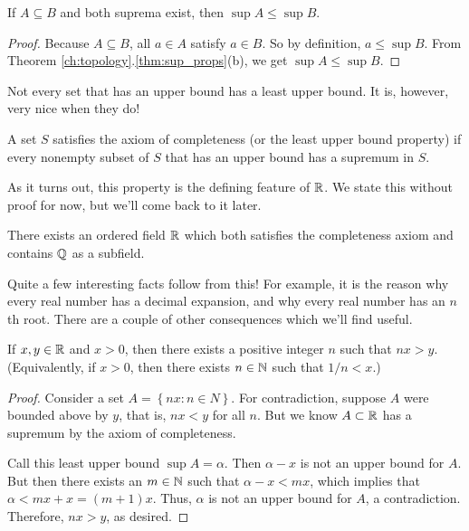 \documentclass[../m131main.tex]{subfiles}
\begin{document}
\begin{theorem}[]
    If $A \subseteq B$ and both suprema exist, then $\sup A \leq \sup B$.
\end{theorem}

\begin{proof}
    Because $A \subseteq B$, all $a \in A$ satisfy $a \in B$.
    So by definition, $a \leq \sup B$.
    From Theorem \ref{ch:topology}.\ref{thm:sup_props}(b), we get $\sup A \leq \sup B$.
\end{proof}

Not every set that has an upper bound has a least upper bound.
It is, however, very nice when they do!

\begin{definition}
    A set $S$ satisfies the axiom of completeness (or the least upper bound property) if every nonempty subset of $S$ that has an upper bound has a supremum in $S$.
\end{definition}

As it turns out, this property is the defining feature of $\R$.
We state this without proof for now, but we'll come back to it later.

\begin{theorem}[Completeness of $\R$]
    There exists an ordered field $\R$ which both satisfies the completeness axiom and contains $\mathbb{Q}$ as a subfield.
\end{theorem}

Quite a few interesting facts follow from this!
For example, it is the reason why every real number has a decimal expansion, and why every real number has an $n$th root.
There are a couple of other consequences which we'll find useful.

\begin{theorem}
    If $x,y \in \mathbb{R}$ and $x > 0$, then there exists a positive integer $n$ such that $nx > y$.
    (Equivalently, if $x > 0$, then there exists $n \in \mathbb{N}$ such that $1 / n < x$.)
\end{theorem}

\begin{proof}
    Consider a set $A = \left\{ nx : n \in N \right\}$.
    For contradiction, suppose $A$ were bounded above by $y$, that is, $nx < y$ for all $n$.
    But we know $A \subset \mathbb{R}$ has a supremum by the axiom of completeness.

    Call this least upper bound $\sup A = \alpha$.
    Then $\alpha - x$ is not an upper bound for $A$.
    But then there exists an $m \in \mathbb{N}$ such that $\alpha - x < mx$, which implies that $\alpha < mx + x = (m+1)x$.
    Thus, $\alpha$ is not an upper bound for $A$, a contradiction.
    Therefore, $nx > y$, as desired.
\end{proof}
\end{document}
